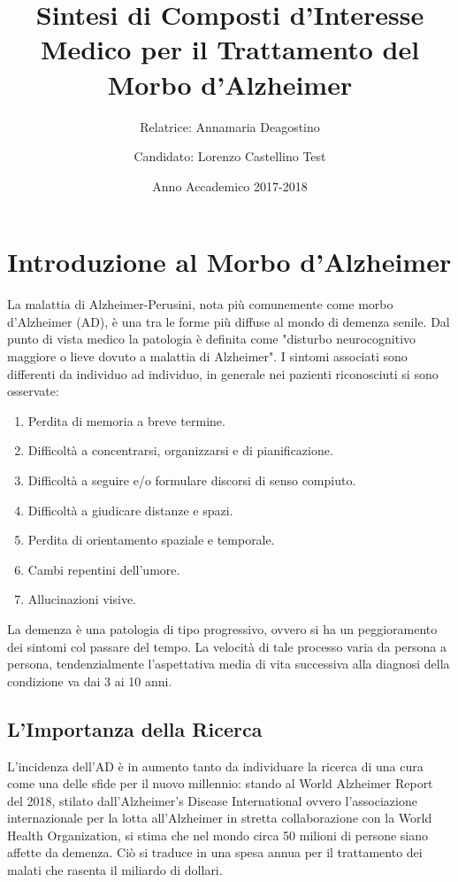 \documentclass[a4paper, 12pt]{article}
\title{Sintesi di Composti d'Interesse Medico per il Trattamento del Morbo d'Alzheimer}
\author{
	Relatrice: Annamaria Deagostino
	\and
	Candidato: Lorenzo Castellino Test
}
\date{Anno Accademico 2017-2018}
\begin{document}
\maketitle
\setcounter{page}{0}
\newpage
\tableofcontents
\newpage
{}

\section{Introduzione al Morbo d'Alzheimer}
La malattia di Alzheimer-Perusini, nota più comunemente come morbo d'Alzheimer (AD), è una tra le forme più diffuse al mondo di demenza senile. Dal punto di vista medico la patologia è definita come "disturbo neurocognitivo maggiore o lieve dovuto a malattia di  Alzheimer".\autocite{american_psychiatric_association_diagnostic_2013}
I sintomi associati sono differenti da individuo ad individuo, in generale nei pazienti riconosciuti si sono osservate:
\begin{enumerate}
	\item Perdita di memoria a breve termine.
	\item Difficoltà a concentrarsi, organizzarsi e di pianificazione.
	\item Difficoltà a seguire e/o formulare discorsi di senso compiuto.
	\item Difficoltà a giudicare distanze e spazi.
	\item Perdita di orientamento spaziale e temporale.
	\item Cambi repentini dell'umore.
	\item Allucinazioni visive.
\end{enumerate}
La demenza è una patologia di tipo progressivo, ovvero si ha un peggioramento dei sintomi col passare del tempo. La velocità di tale processo varia da persona a persona, tendenzialmente l'aspettativa media di vita successiva alla diagnosi della condizione va dai 3 ai 10 anni. \autocite{todd_survival_2013}

\subsection{L'Importanza della Ricerca}
L'incidenza dell'AD è in aumento tanto da individuare la ricerca di una cura come una delle sfide per il nuovo millennio: stando al World Alzheimer Report del 2018, stilato dall'Alzheimer's Disease International ovvero l'associazione internazionale per la lotta all'Alzheimer in stretta collaborazione con la World Health Organization, si stima che nel mondo circa 50 milioni di persone siano affette da demenza. Ciò si traduce in una spesa annua per il trattamento dei malati che rasenta il miliardo di dollari.
\end{document}
